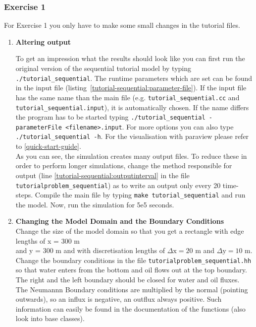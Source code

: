 \subsubsection{Exercise 1}
\renewcommand{\labelenumi}{\alph{enumi})}
For Exercise 1 you only have to make some small changes in the tutorial files.
\begin{enumerate}
\item \textbf{Altering output}

To get an impression what the results should look like you can first run the
original version of the sequential tutorial model by typing  \texttt{./tutorial\_sequential}.
The runtime parameters which are set can be found in the input file (listing~\ref{tutorial-sequential:parameter-file}).
If the input file has the same name than the main file (e.g. \texttt{tutorial\_sequential.cc}
and \texttt{tutorial\_sequential.input}), it is automatically chosen. If the name differs
the program has to be started typing \texttt{./tutorial\_sequential -parameterFile <filename>.input}.
For more options you can also type \texttt{./tutorial\_sequential -h}. For the
visualisation with paraview please refer to \ref{quick-start-guide}.\\
As you can see, the simulation creates many output files. To reduce these in order
to perform longer simulations, change the method responsible for output (line
\ref{tutorial-sequential:outputinterval} in the file \texttt{tutorialproblem\_\allowbreak sequential})
as to write an output only every 20 time-steps. Compile the main file by typing
\texttt{make tutorial\_sequential} and run the model. Now, run the simulation for 5e5 seconds.

\item \textbf{Changing the Model Domain and the Boundary Conditions} \\
Change the size of the model domain so that you get a rectangle
with edge lengths of x = 300 m \\  and y = 300 m and with discretisation lengths
of  $\Delta \text{x} = 20$ m and $\Delta \text{y} = 10$ m. \\
Change the boundary conditions in the file \texttt{tutorialproblem\_sequential.hh}
so that water enters from the bottom and oil flows out at the top boundary. The
right and the left boundary should be closed for water and oil fluxes. The Neumannn
Boundary conditions are multiplied by the normal (pointing outwards), so an influx
is negative, an outflux always positive. Such information can easily be found in the
documentation of the functions (also look into base classes).


\end{enumerate}

